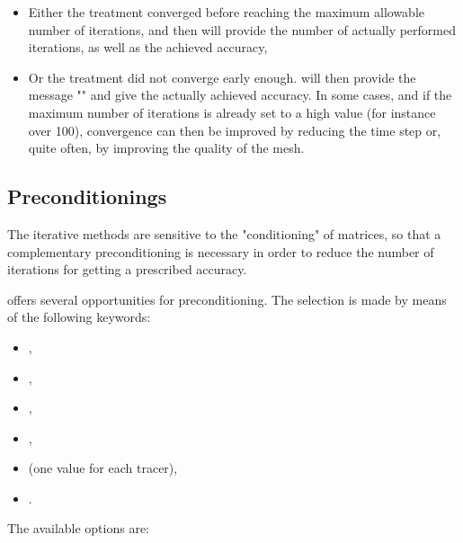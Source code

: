 \begin{itemize}
\item Either the treatment converged before reaching the maximum allowable
number of iterations, and then  will provide the number of actually
performed iterations, as well as the achieved accuracy,

\item Or the treatment did not converge early enough.  will then
provide the message "" and give
the actually achieved accuracy. In some cases, and if the maximum number of
iterations is already set to a high value (for instance over 100), convergence
can then be improved by reducing the time step or, quite often, by improving
the quality of the mesh.
\end{itemize}


\subsection{Preconditionings}
\label{sec:precond}
The iterative methods are sensitive to the "conditioning" of matrices, so that
a complementary preconditioning is necessary in order to reduce the number of
iterations for getting a prescribed accuracy.

 offers several opportunities for preconditioning. The selection is
made by means of the following keywords:

\begin{itemize}
\item {},

\item {},

\item {},

\item {},

\item {} (one value for each
tracer),

\item {}.
\end{itemize}

The available options are:

